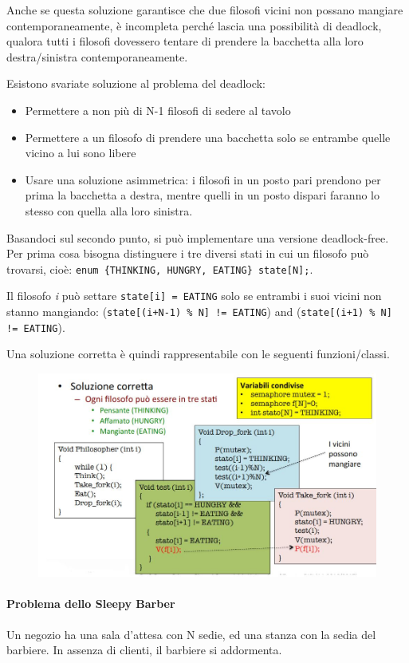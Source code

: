 \documentclass[a4paper]{article}
\begin{document}
Anche se questa soluzione garantisce che due filosofi vicini non possano mangiare contemporaneamente, è incompleta perché lascia una possibilità di deadlock, qualora tutti i filosofi dovessero tentare di prendere la bacchetta alla loro destra/sinistra contemporaneamente.

Esistono svariate soluzione al problema del deadlock:
\begin{itemize}
   \item Permettere a non più di N-1 filosofi di sedere al tavolo
   \item Permettere a un filosofo di prendere una bacchetta solo se entrambe quelle vicino a lui sono libere
   \item Usare una soluzione asimmetrica: i filosofi in un posto pari prendono per prima la bacchetta a destra, mentre quelli in un posto dispari faranno lo stesso con quella alla loro sinistra.
\end{itemize}
Basandoci sul secondo punto, si può implementare una versione deadlock-free. Per prima cosa bisogna distinguere i tre diversi stati in cui un filosofo può trovarsi, cioè: \texttt{enum \{THINKING, HUNGRY, EATING\} state[N];}.

Il filosofo \textit{i} può settare \texttt{state[i] = EATING} solo se entrambi i suoi vicini non stanno mangiando: (\texttt{state[(i+N-1) \% N] != EATING}) and (\texttt{state[(i+1) \% N] != EATING}).

Una soluzione corretta è quindi rappresentabile con le seguenti funzioni/classi.
\begin{figure}[htb]
   \includegraphics[width=\linewidth]{img/filosofi_ok.JPG}
\end{figure}
\newpage
\paragraph{Problema dello Sleepy Barber}
Un negozio ha una sala d'attesa con N sedie, ed una stanza con la sedia del barbiere. In assenza di clienti, il barbiere si addormenta.
\end{document}
